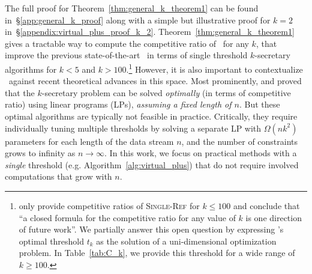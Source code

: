 \label{connection_to_prior_work}
The full proof for Theorem~\ref{thm:general_k_theorem1} can be found in~\S\ref{app:general_k_proof} along with a simple but illustrative proof for $k=2$ in~\S\ref{appendix:virtual_plus_proof_k_2}.
Theorem~\ref{thm:general_k_theorem1} gives a tractable way to compute the competitive ratio of \algoname\ for any $k$, that improve the previous state-of-the-art~\citep{albers2020new} in terms of single threshold $k$-secretary algorithms for $k<5$ and $k>100$.\footnote{\label{foot:closed_form}\citet{albers2020new} only provide competitive ratios of \textsc{Single-Ref} for $k \leq 100$ and conclude that ``a closed formula for the competitive ratio for any value
of $k$ is one direction of future work''. We partially answer this open question by expressing \algoname's optimal threshold $t_k$ as the solution of a uni-dimensional optimization problem. In Table~\ref{tab:C_k}, we provide this threshold for a wide range of $k \geq 100$.} 
However, it is also important to contextualize \algoname\ against recent theoretical advances in this space. 
Most prominently, \citet{buchbinder2014secretary} and \citet{chan2014revealing} proved that the $k$-secretary problem can be solved {\em optimally} (in terms of competitive ratio) using linear programs (LPs), {\em assuming a fixed length of $n$}. But these optimal algorithms are typically not feasible in practice.
Critically, they require individually tuning multiple thresholds by solving a separate LP with $\Omega(n k^2)$ parameters for each length of the data stream $n$, and the number of constraints grows to infinity as  $n\rightarrow\infty$. 
In this work, we focus on practical methods with a \emph{single} threshold (e.g. Algorithm~\ref{alg:virtual_plus}) that do not require involved computations that grow with $n$. 



